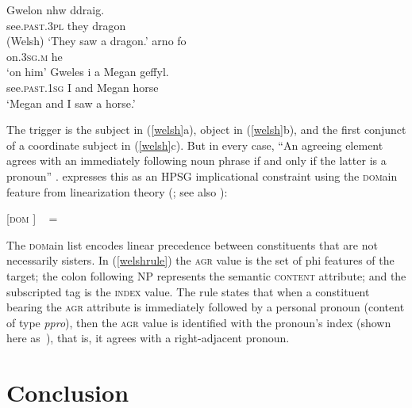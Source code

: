 \documentclass[output=paper
 	        ,biblatex
                ,babelshorthands
                ,newtxmath
                ,draftmode
                ,colorlinks, citecolor=brown
]{langscibook}
\begin{document}
\begin{exe}
\ex \label{welsh}
\begin{xlist}
\ex
\gll 	Gwelon nhw ddraig. \\
see.\textsc{past.3pl} they dragon \\\hfill(Welsh)
\glt `They saw a dragon.’
\ex 
\gll 	arno fo \\
on.\textsc{3sg.m} he \\
\glt `on him’
\ex 
\gll 	Gweles i a Megan geffyl. \\
see.\textsc{past.1sg} I and Megan horse \\
\glt `Megan and I saw a horse.’
\end{xlist}
\end{exe}

\noindent
The trigger is the subject in (\ref{welsh}a), object in (\ref{welsh}b), and the first conjunct of a coordinate subject in (\ref{welsh}c).  But in every case, ``An agreeing element agrees with an immediately following noun phrase if and only if the latter is a pronoun'' \citep[237]{Borsley:2009}. \citet[257]{Borsley:2009} expresses this as an HPSG implicational constraint using the \textsc{dom}ain feature from linearization theory (\citealt{reape:1994,Mueller95c,Mueller99a,Kathol:2000}; see also ):

\begin{exe}
\ex \label{welshrule}
{}[\textsc{dom}   ]  %
\impl  \  = 
\end{exe}

\noindent
The \textsc{dom}ain list encodes linear precedence between constituents that are not necessarily sisters.  In (\ref{welshrule}) the \textsc{agr} value is the set of phi features of the target; the colon following NP represents the semantic \textsc{content} attribute; and the subscripted tag  is the \textsc{index} value.  The rule states that when a constituent bearing the \textsc{agr} attribute is immediately followed by a personal pronoun (content of type \textit{ppro}), then the \textsc{agr} value is identified with the pronoun's index (shown here as \,), that is, it agrees with a right-adjacent pronoun.  



\section{Conclusion} 
\end{document}
